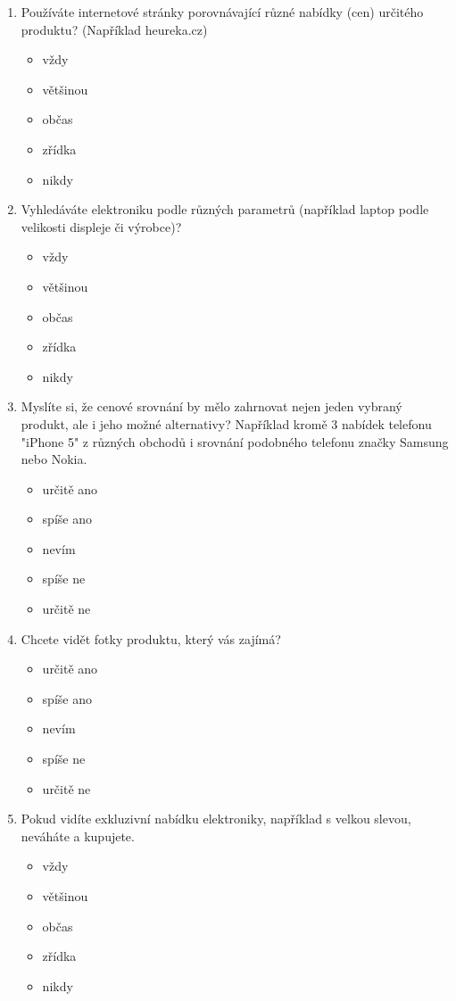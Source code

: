 \documentclass[12pt,oneside,openany]{fithesis}
\begin{document}
\begin{enumerate}
  
\item Používáte internetové stránky porovnávající různé nabídky (cen) určitého produktu? (Například heureka.cz) 
    \begin{itemize}
       \item vždy
       \item většinou
       \item občas
       \item zřídka
       \item nikdy
    \end{itemize}

\item Vyhledáváte elektroniku podle různých parametrů (například laptop podle velikosti displeje či výrobce)? 
    \begin{itemize}
       \item vždy
       \item většinou
       \item občas
       \item zřídka
       \item nikdy
    \end{itemize}

  \item Myslíte si, že cenové srovnání by mělo zahrnovat nejen jeden vybraný produkt, ale i jeho možné alternativy? 
      Například kromě 3 nabídek telefonu "iPhone 5" z různých obchodů i srovnání podobného telefonu značky Samsung nebo Nokia.
    \begin{itemize}
       \item určitě ano
       \item spíše ano
       \item nevím
       \item spíše ne
       \item určitě ne
    \end{itemize}

  \item Chcete vidět fotky produktu, který vás zajímá?
    \begin{itemize}
       \item určitě ano
       \item spíše ano
       \item nevím
       \item spíše ne
       \item určitě ne
    \end{itemize}

  \item Pokud vidíte exkluzivní nabídku elektroniky, například s velkou slevou, neváháte a kupujete.
    \begin{itemize}
       \item vždy
       \item většinou
       \item občas
       \item zřídka
       \item nikdy
    \end{itemize}


\end{enumerate}
\end{document}
